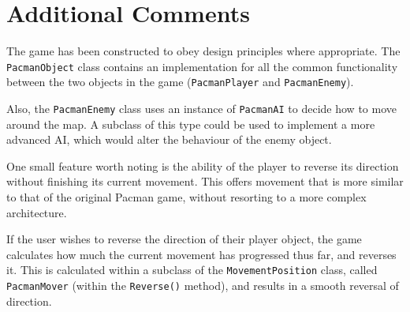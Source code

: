 \documentclass[a4paper,11pt]{article}
\begin{document}
    \section{Additional Comments}

    The game has been constructed to obey design principles where appropriate.
    The \verb!PacmanObject! class contains an implementation for all the common
    functionality between the two objects in the game (\verb!PacmanPlayer! and
    \verb!PacmanEnemy!).
    
    Also, the \verb!PacmanEnemy! class uses an instance of \verb!PacmanAI! to
    decide how to move around the map. A subclass of this type could be used to
    implement a more advanced AI, which would alter the behaviour of the enemy
    object.

    One small feature worth noting is the ability of the player to reverse its
    direction without finishing its current movement.  This offers movement
    that is more similar to that of the original Pacman game, without resorting
    to a more complex architecture.

    If the user wishes to reverse the direction of their player object, the
    game calculates how much the current movement has progressed thus far, and
    reverses it. This is calculated within a subclass of the
    \verb!MovementPosition! class, called \verb!PacmanMover! (within the
    \verb!Reverse()! method), and results in a smooth reversal of direction.
\end{document}
